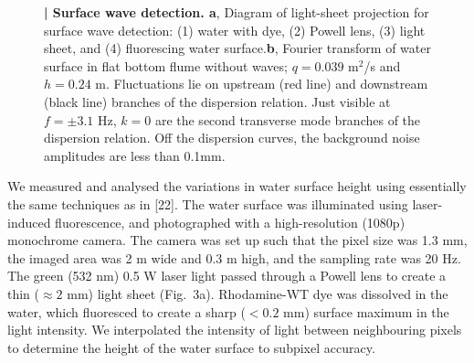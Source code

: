 \documentclass[12pt,aps%
]{revtex4}
\begin{document}
\begin{figure}
\begin{center}
\caption{{\bf  | Surface wave detection. a}, Diagram of light-sheet
projection for surface wave detection: (1) water with dye, (2) Powell lens,
(3) light sheet, and (4) fluorescing water surface.{\bf b}, Fourier transform of
water surface in flat bottom flume without waves; $q = 0.039$ m${}^2$/s and $h =
0.24$ m. Fluctuations lie on upstream (red line) and downstream (black line)
branches of the dispersion relation. Just visible at $f = \pm 3.1$ Hz, $k = 0$ are the
second transverse mode branches of the dispersion relation. Off the dispersion
curves, the background noise amplitudes are less than 0.1mm.
}
\end{center}
\end{figure}


We measured and analysed the variations in water surface height using
essentially the same techniques as in [22]. The water surface was illuminated
using laser-induced fluorescence, and photographed with a high-resolution
(1080p) monochrome camera.  The camera was set up such that the pixel size was
1.3 mm, the imaged area was 2 m wide and 0.3 m high, and the sampling rate was
20 Hz. The green (532 nm) 0.5 W laser light passed through a Powell lens to 
create a thin ($\approx 2$ mm) light sheet (Fig.\ 3a).
Rhodamine-WT dye was dissolved in the water, which fluoresced to create a
sharp ($< 0.2$ mm) surface maximum in the light intensity. We interpolated the
intensity of light between neighbouring pixels to determine the height of the
water surface to subpixel accuracy.
\end{document}
